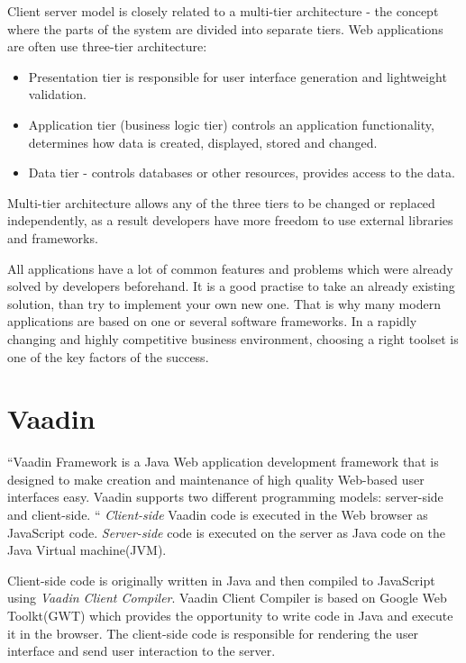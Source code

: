     	Client server model is closely related to a multi-tier architecture - the
    	concept where the parts of the system are divided into separate tiers. Web applications
    	 are often use three-tier architecture:
    	 \begin{itemize}
    	   \item Presentation tier is responsible for user interface generation and
    	   lightweight validation.
    	   \item Application tier (business logic tier) controls an application
    	   functionality, determines how data is created, displayed, stored and
    	   changed.
    	   \item Data tier - controls databases or other resources, provides access
    	   to the data.
    	 \end{itemize}
    	Multi-tier architecture allows any of the three tiers to be changed or
    	replaced independently, as a result developers have more freedom to use
    	external libraries and frameworks.
		
		All	applications have a lot of common features and problems which were already
		solved by developers beforehand. It is a good practise to take an already
		existing solution, than try to implement your own new one. That is why many
		modern applications are based on one or several software frameworks. In a
		rapidly changing and highly competitive business environment, choosing a right toolset is one of
		the key factors of the success.	 	
		
  \section{Vaadin}
  \label{ch:vaadin}
   ``Vaadin Framework is a Java Web application development framework that is
  designed to make creation and maintenance of high quality Web-based user interfaces easy.
   Vaadin supports two different programming models: server-side and client-side. 
   `` \cite[pr1.1]{bookVaaidn}
   \emph{Client-side} Vaadin code is executed in the Web browser as JavaScript
   code.
   \emph{Server-side} code is executed on the server as Java code on the Java
   Virtual machine(JVM).

   Client-side code is originally written in Java and then
   compiled to JavaScript using \emph{Vaadin Client Compiler}. Vaadin Client Compiler is based on Google
   Web Toolkt(GWT) which provides the opportunity to write code in Java and
   execute it in the browser. The client-side code is responsible for rendering
   the user interface and send user interaction to the server.
  
